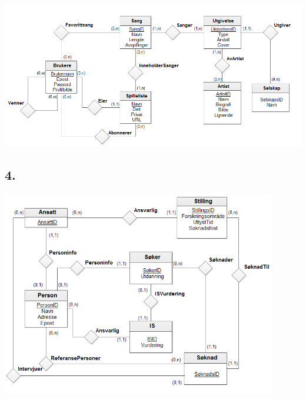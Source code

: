 \documentclass[a4paper]{article}
\begin{document}
\begin{center}
\includegraphics[width=1\textwidth]{oving1-3.png}
\par\end{center}

\subsection*{4.}

\begin{center}
\includegraphics[width=0.9\textwidth]{oving1-4.png}
\par\end{center}
\end{document}

